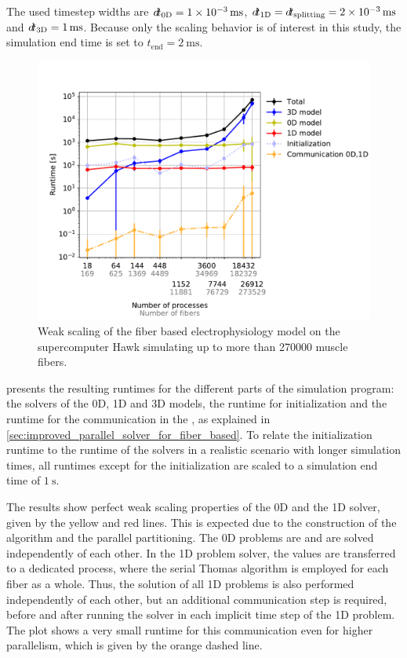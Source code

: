 The used timestep widths are $\dt_\text{0D}=\SI{1e-3}{\milli\second}$, $\dt_\text{1D}=\dt_\text{splitting}=\SI{2e-3}{\milli\second}$ and $\dt_\text{3D}=\SI{1}{\milli\second}$. Because only the scaling behavior is of interest in this study, the simulation end time is set to $t_\text{end}=\SI{2}{\milli\second}$.

\begin{figure}[H]
  \centering%
  \includegraphics[width=\textwidth]{images/results/studies/hawk_weak_scaling.pdf}%
  \caption{Weak scaling of the fiber based electrophysiology model on the supercomputer Hawk simulating up to more than \num{270000} muscle fibers.}%
  \label{fig:hawk_weak_scaling}%
\end{figure}

 presents the resulting runtimes for the different parts of the simulation program: the solvers of the 0D, 1D and 3D models, the runtime for initialization and the runtime for the communication in the , as explained in \cref{sec:improved_parallel_solver_for_fiber_based}.
To relate the initialization runtime to the runtime of the solvers in a realistic scenario with longer simulation times, all runtimes except for the initialization are scaled to a simulation end time of $\SI{1}{\second}$.

The results show perfect weak scaling properties of the 0D and the 1D solver, given by the yellow and red lines. This is expected due to the construction of the algorithm and the parallel partitioning. The 0D problems are  and are solved independently of each other. In the 1D problem solver, the values are  transferred to a dedicated process, where the serial Thomas algorithm is employed for each fiber as a whole. Thus, the solution of all 1D problems is also performed independently of each other, but an additional communication step is required, before and after running the solver in each implicit time step of the 1D problem.
The plot shows a very small runtime for this communication even for higher parallelism, which is given by the orange dashed line.

